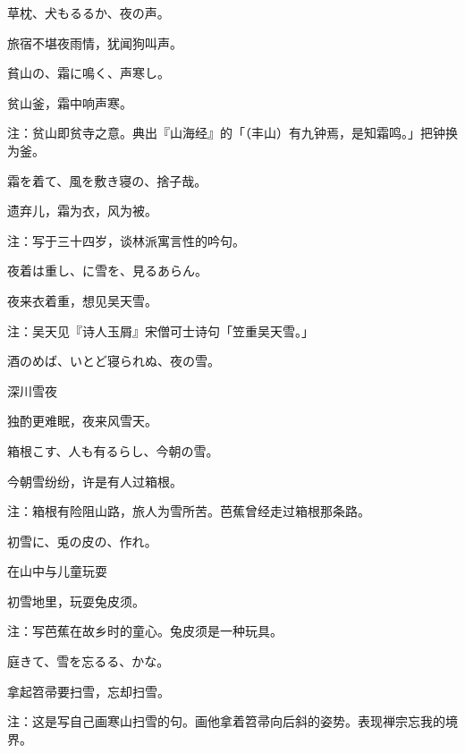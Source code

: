 \begin{haiku}
    {\FH 草枕、犬もるるか、夜の声。}

    {\FK 旅宿不堪夜雨情，犹闻狗叫声。}
\end{haiku}

\begin{haiku}
    {\FH 貧山の、霜に鳴く、声寒し。}

    {\FK 贫山釜，霜中响声寒。}

    {\FT 注：贫山即贫寺之意。典出『山海经』的「（丰山）有九钟焉，是知霜鸣。」把钟换为釜。}
\end{haiku}

\begin{haiku}
    {\FH 霜を着て、風を敷き寝の、捨子哉。}

    {\FK 遗弃儿，霜为衣，风为被。}

    {\FT 注：写于三十四岁，谈林派寓言性的吟句。}
\end{haiku}

\begin{haiku}
    {\FH 夜着は重し、に雪を、見るあらん。}

    {\FK 夜来衣着重，想见吴天雪。}

    {\FT 注：吴天见『诗人玉屑』宋僧可士诗句「笠重吴天雪。」}
\end{haiku}

\begin{haiku}
    {\FH 酒のめば、いとど寝られぬ、夜の雪。}

    {\FK 深川雪夜}

    {\FK 独酌更难眠，夜来风雪天。}
\end{haiku}

\begin{haiku}
    {\FH 箱根こす、人も有るらし、今朝の雪。}

    {\FK 今朝雪纷纷，许是有人过箱根。}

    {\FT 注：箱根有险阻山路，旅人为雪所苦。芭蕉曾经走过箱根那条路。}
\end{haiku}

\begin{haiku}
    {\FH 初雪に、兎の皮の、作れ。}

    {\FK 在山中与儿童玩耍}

    {\FK 初雪地里，玩耍兔皮须。}

    {\FT 注：写芭蕉在故乡时的童心。兔皮须是一种玩具。}
\end{haiku}

\begin{haiku}
    {\FH 庭きて、雪を忘るる、かな。}

    {\FK 拿起笤帚要扫雪，忘却扫雪。}

    {\FT 注：这是写自己画寒山扫雪的句。画他拿着笤帚向后斜的姿势。表现禅宗忘我的境界。}
\end{haiku}

